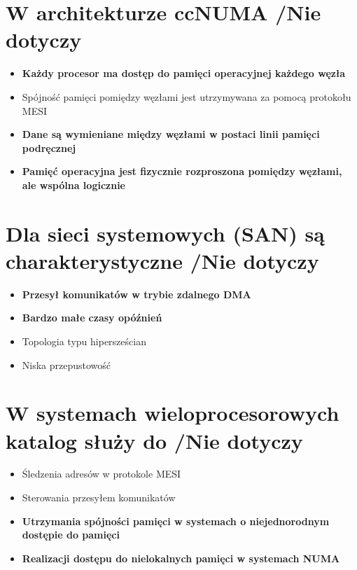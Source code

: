 \section{W architekturze ccNUMA {\small /Nie dotyczy}}
	\begin{itemize}
    \item \textbf{Każdy procesor ma dostęp do pamięci operacyjnej każdego węzła}
    \item Spójność pamięci pomiędzy węzłami jest utrzymywana za pomocą protokołu MESI
    \item \textbf{Dane są wymieniane między węzłami w postaci linii pamięci podręcznej}
    \item \textbf{Pamięć operacyjna jest fizycznie rozproszona pomiędzy węzłami, ale wspólna logicznie}
    \end{itemize}

\section{Dla sieci systemowych (SAN) są charakterystyczne {\small /Nie dotyczy}}
	\begin{itemize}
    \item \textbf{Przesył komunikatów w trybie zdalnego DMA}
    \item \textbf{Bardzo małe czasy opóźnień}
    \item Topologia typu hipersześcian
    \item Niska przepustowość
    \end{itemize}

\section{W systemach wieloprocesorowych katalog służy do {\small /Nie dotyczy}}
	\begin{itemize}
    \item Śledzenia adresów w protokole MESI
    \item Sterowania przesyłem komunikatów
    \item \textbf{Utrzymania spójności pamięci w systemach o niejednorodnym dostępie do pamięci}
    \item \textbf{Realizacji dostępu do nielokalnych pamięci w systemach NUMA}
    \end{itemize}

